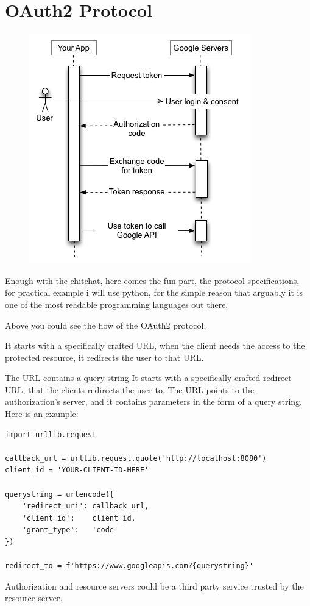\documentclass[11pt]{style}
\begin{document}
\section{OAuth2 Protocol}
\begin{figure}[h]
    \centering
    \includegraphics[width=.5\textwidth]{authorization-code.png}
\end{figure}

Enough with the chitchat, here comes the fun part, the protocol specifications,
for practical example i will use python, for the simple reason that arguably it
is one of the most readable programming languages out there.

Above you could see the flow of the OAuth2 protocol.

It starts with a specifically crafted URL, when the client needs the access to
the protected resource, it redirects the user to that URL.

The URL contains a query string
It starts with a specifically crafted redirect URL, that the clients
redirects the user to.
The URL points to the authorization's server, and it contains parameters in the
form of a query string. Here is an example:

\begin{lstlisting}
import urllib.request

callback_url = urllib.request.quote('http://localhost:8080')
client_id = 'YOUR-CLIENT-ID-HERE'

querystring = urlencode({
    'redirect_uri': callback_url,
    'client_id':    client_id,
    'grant_type':   'code'
})

redirect_to = f'https://www.googleapis.com?{querystring}'
\end{lstlisting}


Authorization and resource servers could be a third party service trusted by the
resource server.
\end{document}
